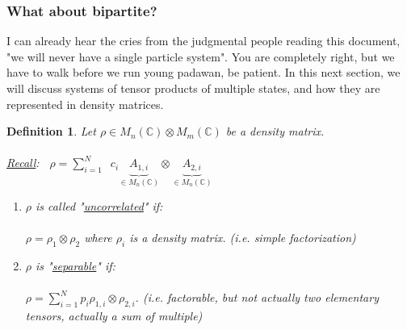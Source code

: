 \documentclass[12pt]{article}
\theoremstyle{plain}
\theoremstyle{nonumberplain}
\theoremstyle{plain}
\newtheorem{definition}[lemma]{Definition}
\theoremstyle{nonumberplain}
\newcommand\1{{\bf 1}}
\newcommand{\C}{\mathbb{C}} %
\newcommand{\<}{\left\langle}
\renewcommand{\>}{\right\rangle}
\begin{document}
\subsubsection{What about bipartite?}
I can already hear the cries from the judgmental people reading this document, "we will never have a single particle system".  You are completely right, but we have to walk before we run young padawan, be patient.  In this next section, we will discuss systems of tensor products of multiple states, and how they are represented in density matrices.
\begin{definition} Let $\rho \in M_n(\C) \otimes M_m(\C)$ be a density matrix.\\
\\
\underline{Recall}: $\;\;\rho = \sum_{i=1}^{N}\;\; c_i \underbrace{A_{1,i}}_{\in M_n(\C)} \otimes \underbrace{A_{2,i}}_{\in M_n(\C)} $ \\
\begin{enumerate}
\item $\rho$ is called "\underline{uncorrelated}" if:         \\
\\
$\rho = \rho_1 \otimes \rho_2$ where $\rho_i$ is a density matrix.   (i.e. simple factorization)

\item $\rho$ is "\underline{separable}" if:          \\
\\
$\rho = \sum_{i=1}^{N} p_i \rho_{1,i} \otimes \rho_{2,i}$. (i.e. factorable, but not actually two elementary tensors, actually a sum of multiple)


\end{enumerate}
\end{definition}
\end{document}
